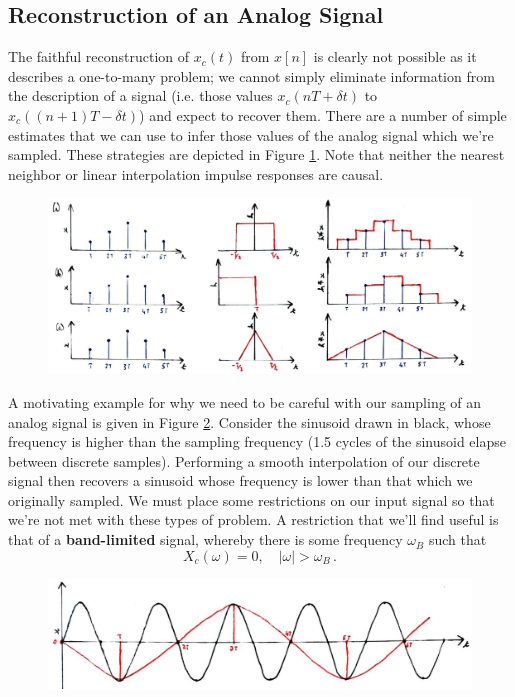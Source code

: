 \subsection{Reconstruction of an Analog Signal}
%
The faithful reconstruction of $x_c(t)$ from $x[n]$ is clearly not possible
as it describes a one-to-many problem; we cannot simply eliminate information
from the description of a signal (i.e. those values $x_c(nT + \delta t)$ to
$x_c((n+1)T - \delta t)$) and expect to recover them. There are a number of
simple estimates that we can use to infer those values of the analog signal
which we're sampled. These strategies are depicted in Figure
\ref{fig::lecture_13_interpolation_filters}. Note that neither the nearest
neighbor or linear interpolation impulse responses are causal.\\
%
\begin{figure}[H]
  \includegraphics[width=\textwidth]{images/lecture_13_interpolation_filters.JPG}
  \caption{
  }
  \label{fig::lecture_13_interpolation_filters}
\end{figure}
%
A motivating example for why we need to be careful with our sampling of
an analog signal is given in Figure \ref{fig::lecture_13_aliasing}. Consider the sinusoid drawn in
black, whose frequency is higher than the sampling frequency (1.5 cycles
of the sinusoid elapse between discrete samples). Performing a smooth
interpolation of our discrete signal then recovers a sinusoid whose frequency
is lower than that which we originally sampled. We must place some
restrictions on our input signal so that we're not met with these types
of problem. A restriction that we'll find useful is that of a
\textbf{band-limited} signal, whereby there is some frequency $\omega_B$
such that
%
\begin{displaymath}
  X_c(\omega) = 0,\quad |\omega| > \omega_B \,.
\end{displaymath}
%
\begin{figure}[H]
  \includegraphics[width=\textwidth]{images/lecture_13_aliasing.JPG}
  \caption{
  }
  \label{fig::lecture_13_aliasing}
\end{figure}
%

